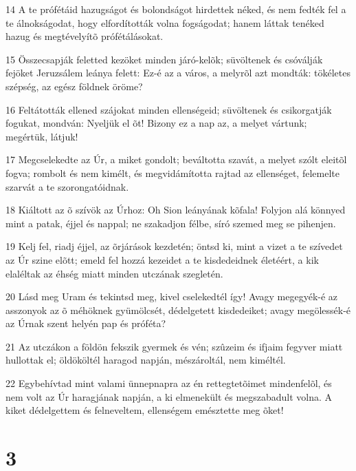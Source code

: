 \par 14 A te prófétáid hazugságot és bolondságot hirdettek néked, és nem fedték fel a te álnokságodat, hogy elfordították volna fogságodat; hanem láttak tenéked hazug és megtévelyítõ prófétálásokat.
\par 15 Összecsapják feletted kezöket minden járó-kelõk; süvöltenek és csóválják fejöket Jeruzsálem leánya felett: Ez-é az a város, a melyrõl azt mondták: tökéletes szépség, az egész földnek öröme?
\par 16 Feltátották ellened szájokat minden ellenségeid; süvöltenek és csikorgatják fogukat, mondván: Nyeljük el õt! Bizony ez a nap az, a melyet vártunk; megértük, látjuk!
\par 17 Megcselekedte az Úr, a miket gondolt; beváltotta szavát, a melyet szólt eleitõl fogva; rombolt és nem kimélt, és megvidámította rajtad az ellenséget, felemelte szarvát a te szorongatóidnak.
\par 18 Kiáltott az õ szívök az Úrhoz: Oh Sion leányának kõfala! Folyjon alá könnyed mint a patak, éjjel és nappal; ne szakadjon félbe, síró szemed meg se pihenjen.
\par 19 Kelj fel, riadj éjjel, az õrjárások kezdetén; öntsd ki, mint a vizet a te szívedet az Úr szine elõtt; emeld fel hozzá kezeidet a te kisdedeidnek életéért, a kik elaléltak az éhség miatt minden utczának szegletén.
\par 20 Lásd meg Uram és tekintsd meg, kivel cselekedtél így! Avagy megegyék-é az asszonyok az õ méhöknek gyümölcsét, dédelgetett kisdedeiket; avagy megölessék-é az Úrnak szent helyén pap és próféta?
\par 21 Az utczákon a földön fekszik gyermek és vén; szûzeim és ifjaim fegyver miatt hullottak el; öldököltél haragod napján, mészároltál, nem kiméltél.
\par 22 Egybehívtad mint valami ünnepnapra az én rettegtetõimet mindenfelõl, és nem volt az Úr haragjának napján, a ki elmenekült és megszabadult volna. A kiket dédelgettem és felneveltem, ellenségem emésztette meg õket!

\chapter{3}

